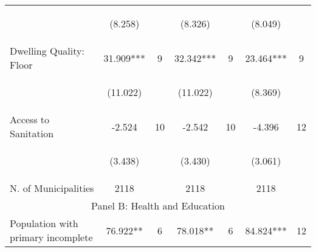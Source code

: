 \begin{tabular}{lcccccc}
\vspace{4pt} &  \begin{footnotesize}(8.258)\end{footnotesize}   & &
			    \begin{footnotesize}(8.326)\end{footnotesize}   & &
			    \begin{footnotesize}(8.049)\end{footnotesize}   &
			     \\          



Dwelling Quality: Floor   &  31.909***   &  9  &   32.342***  &  9 &  23.464***  &  9   \\

\vspace{4pt} &  \begin{footnotesize}(11.022)\end{footnotesize}   & &
			    \begin{footnotesize}(11.022)\end{footnotesize}   & &
			    \begin{footnotesize}(8.369)\end{footnotesize}   &
			     \\          

Access to Sanitation   &  -2.524   &  10  &   -2.542  &  10 &  -4.396  &  12   \\

\vspace{4pt} &  \begin{footnotesize}(3.438)\end{footnotesize}   & &
			    \begin{footnotesize}(3.430)\end{footnotesize}   & &
			    \begin{footnotesize}(3.061)\end{footnotesize}   &
			     \\          

N. of Municipalities  &   2118   &  &  2118    & &  2118  &    \\

\hline		
\multicolumn{7}{c}{Panel B: Health and Education}   \\                                                          


Population with primary incomplete   &  76.922**   &  6  &   78.018**  &  6 &  84.824***  &  12   \\



\end{tabular}
